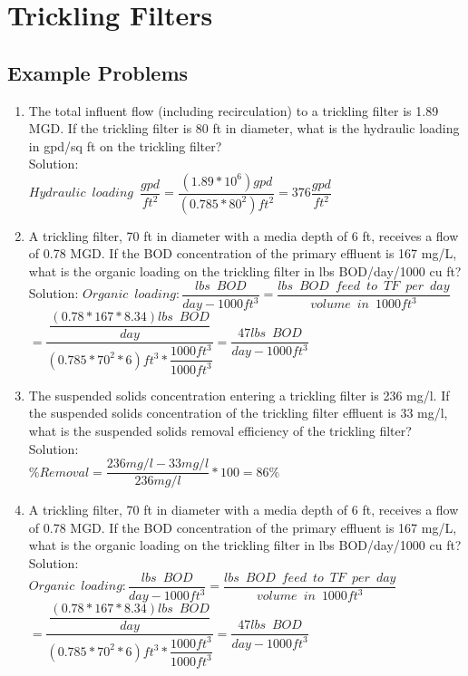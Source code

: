 \documentclass{article}
\begin{document}
\newpage
\section{Trickling Filters}

\subsection{Example Problems} 

\begin{enumerate}


\item The total influent flow (including recirculation) to a trickling filter is 1.89 MGD. If the trickling filter is 80 ft in diameter, what is the hydraulic loading in gpd/sq ft on the trickling filter?\\
Solution:\\
$Hydraulic \enspace loading \enspace \dfrac{gpd}{ft^2}=\dfrac{(1.89*10^6)gpd}{(0.785*80^2)ft^2} =\boxed{376\dfrac{gpd}{ft^2}}$

\item A trickling filter, 70 ft in diameter with a media depth of 6 ft, receives a flow of 0.78 MGD. If the BOD concentration of the primary effluent is 167 mg/L, what is the organic loading on the trickling filter in lbs BOD/day/1000 cu ft?\\
Solution:  $Organic \enspace loading:\dfrac{lbs \enspace BOD}{day-1000ft^3}=\dfrac{lbs \enspace BOD \enspace feed \enspace to \enspace TF \enspace per \enspace day}{volume \enspace in \enspace 1000ft^3}$\\
$=\dfrac{\dfrac{(0.78*167*8.34)lbs \enspace BOD}{day}}{(0.785*70^2*6)ft^3*\dfrac{1000ft^3}{1000ft^3}}=\boxed{\dfrac{47 lbs \enspace BOD}{day-1000 ft^3}}$

\item The suspended solids concentration entering a trickling filter is 236 mg/l. If the suspended solids concentration of the trickling filter effluent is 33 mg/l, what is the suspended solids removal efficiency of the trickling filter?\\
Solution:\\
$\% Removal=\dfrac{236 mg/l-33 mg/l}{236 mg/l}*100=\boxed{86\%}$


\item A trickling filter, 70 ft in diameter with a media depth of 6 ft, receives a flow of 0.78 MGD. If the BOD concentration of the primary effluent is 167 mg/L, what is the organic loading on the trickling filter in lbs BOD/day/1000 cu ft?\\
Solution:\\
$Organic \enspace loading:\dfrac{lbs \enspace BOD}{day-1000ft^3}=\dfrac{lbs \enspace BOD \enspace feed \enspace to \enspace TF \enspace per \enspace day}{volume \enspace in \enspace 1000ft^3}$\\
$=\dfrac{\dfrac{(0.78*167*8.34)lbs \enspace BOD}{day}}{(0.785*70^2*6)ft^3*\dfrac{1000ft^3}{1000ft^3}}=\boxed{\dfrac{47 lbs \enspace BOD}{day-1000 ft^3}}$


\end{enumerate}
\end{document}
